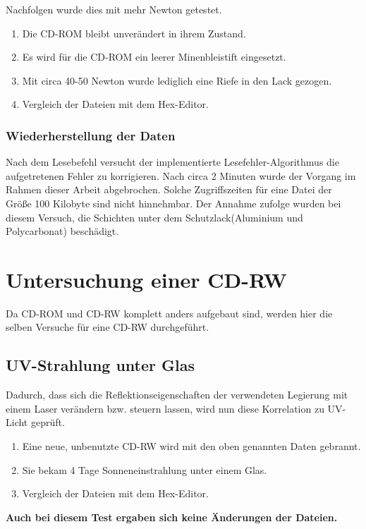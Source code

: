 \documentclass[10pt,a4paper]{article} %
\begin{document}
Nachfolgen wurde dies mit mehr Newton getestet.
\begin{enumerate}
\item Die CD-ROM bleibt unverändert in ihrem Zustand.
\item Es wird für die CD-ROM ein leerer Minenbleistift eingesetzt.
\item Mit circa 40-50 Newton wurde lediglich eine Riefe in den Lack gezogen.
\item Vergleich der Dateien mit dem Hex-Editor. 
\end{enumerate}

\subsubsection{Wiederherstellung der Daten}

Nach dem Lesebefehl versucht der implementierte Lesefehler-Algorithmus die aufgetretenen Fehler zu korrigieren. Nach circa 2 Minuten wurde der Vorgang im Rahmen dieser Arbeit abgebrochen. Solche Zugriffszeiten für eine Datei der Größe 100 Kilobyte sind nicht hinnehmbar. Der Annahme zufolge wurden bei diesem Versuch, die Schichten unter dem Schutzlack(Aluminium und Polycarbonat) beschädigt.






\newpage
\section{Untersuchung einer CD-RW}
Da CD-ROM und CD-RW komplett anders aufgebaut sind, werden hier die selben Versuche für eine CD-RW durchgeführt.
\subsection{UV-Strahlung unter Glas}
Dadurch, dass sich die Reflektionseigenschaften der verwendeten Legierung mit einem Laser verändern bzw. steuern lassen, wird nun diese Korrelation zu UV-Licht geprüft.

\begin{enumerate}
\item Eine neue, unbenutzte CD-RW wird mit den oben genannten Daten gebrannt.
\item Sie bekam 4 Tage Sonneneinstrahlung unter einem Glas.
\item Vergleich der Dateien mit dem Hex-Editor. 
\end{enumerate}

\textbf{Auch bei diesem Test ergaben sich keine Änderungen der Dateien.}\\\\
\end{document}
